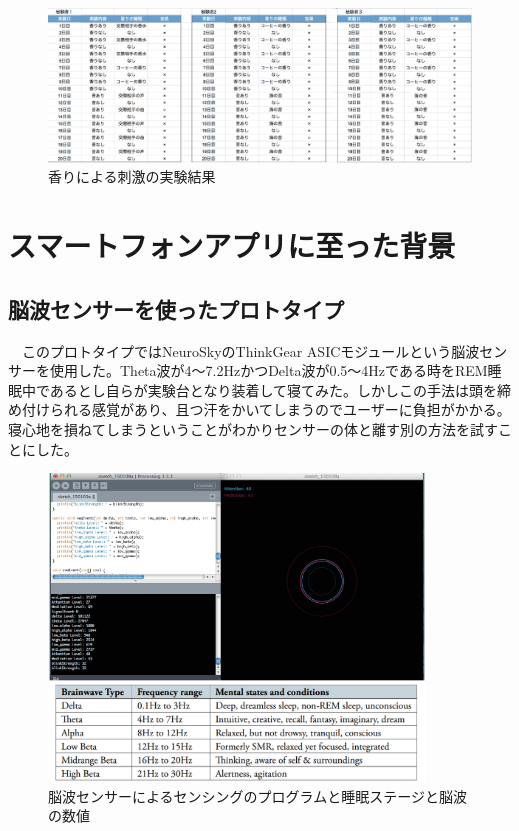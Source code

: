 \begin{figure}[htbp]
\begin{center}
\includegraphics[width=15cm]{eps/smellExperiment.eps}
\caption{香りによる刺激の実験結果}
\label{smellExperiment}
\end{center}
\end{figure}

\section{スマートフォンアプリに至った背景}


\subsection{脳波センサーを使ったプロトタイプ}
　このプロトタイプではNeuroSkyのThinkGear ASICモジュールという脳波センサーを使用した。Theta波が4〜7.2HzかつDelta波が0.5〜4Hzである時をREM睡眠中であるとし自らが実験台となり装着して寝てみた。しかしこの手法は頭を締め付けられる感覚があり、且つ汗をかいてしまうのでユーザーに負担がかかる。寝心地を損ねてしまうということがわかりセンサーの体と離す別の方法を試すことにした。
\begin{figure}[htbp]
\begin{center}
\includegraphics[width=10cm]{eps/brainWave.eps}
\caption{脳波センサーによるセンシングのプログラムと睡眠ステージと脳波の数値}
\label{brainWave}
\end{center}
\end{figure}

